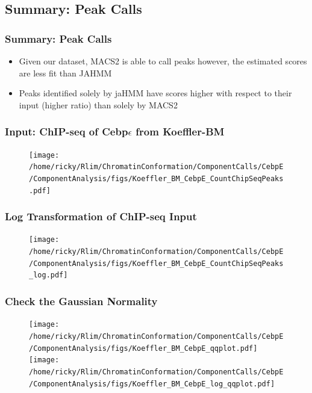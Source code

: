 \documentclass[notes]{beamer}
\begin{document}
\subsection{Summary: Peak Calls}
\begin{frame}
    \frametitle{Summary: Peak Calls}
    \begin{itemize}[<+->]
        \item Given our dataset, MACS2 is able to call peaks however, the estimated scores are less fit than JAHMM 
        \item Peaks identified solely by jaHMM have scores higher with respect to their input (higher ratio) than solely by MACS2  
    \end{itemize}
\end{frame}

\begin{frame}

\end{frame}

\begin{frame}
    \frametitle{Input: ChIP-seq of Cebp$\epsilon$ from Koeffler-BM}
    \begin{figure}
        \texttt{[image: /home/ricky/Rlim/ChromatinConformation/ComponentCalls/CebpE/ComponentAnalysis/figs/Koeffler\_BM\_CebpE\_CountChipSeqPeaks.pdf]}
    \end{figure}
\end{frame}

\begin{frame}                                                                                                                        
    \frametitle{Log Transformation of ChIP-seq Input}
    \begin{figure}
        \texttt{[image: /home/ricky/Rlim/ChromatinConformation/ComponentCalls/CebpE/ComponentAnalysis/figs/Koeffler\_BM\_CebpE\_CountChipSeqPeaks\_log.pdf]}
    \end{figure}
\end{frame}

\begin{frame}                                                                                                                        
    \frametitle{Check the Gaussian Normality}
    \begin{figure}
        \texttt{[image: /home/ricky/Rlim/ChromatinConformation/ComponentCalls/CebpE/ComponentAnalysis/figs/Koeffler\_BM\_CebpE\_qqplot.pdf]}
        \texttt{[image: /home/ricky/Rlim/ChromatinConformation/ComponentCalls/CebpE/ComponentAnalysis/figs/Koeffler\_BM\_CebpE\_log\_qqplot.pdf]}
    \end{figure}
\end{frame}
\end{document}
